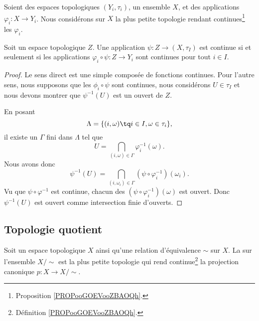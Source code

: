 \begin{proposition}
    Soient des espaces topologiques \( (Y_i,\tau_i)\), un ensemble \( X\), et des applications \( \varphi_i\colon X\to Y_i\). Nous considérons sur \( X\) la plus petite topologie rendant continues\footnote{Proposition \ref{PROPooGOEVooZBAOQh}.} les \( \varphi_i\).

    Soit un espace topologique \( Z\). Une application \( \psi\colon Z\to (X,\tau_I)\) est continue si et seulement si les applications \( \varphi_i\circ\psi\colon Z\to Y_i\) sont continues pour tout \( i\in I\).
\end{proposition}

\begin{proof}
    Le sens direct est une simple composée de fonctions continues. Pour l'autre sens, nous supposons que les \( \phi_i\circ\psi\) sont continues, nous considérons \( U\in \tau_I\) et nous devons montrer que \( \psi^{-1}(U)\) est un ouvert de \( Z\).

    En posant 
    \begin{equation}
        \Lambda=\{ (i,\omega)\tq i\in I,\omega\in \tau_i \},
    \end{equation}
    il existe un \( \Gamma\) fini dans \( \Lambda\) tel que
    \begin{equation}
        U=\bigcap_{(i,\omega)\in \Gamma}\varphi_i^{-1}(\omega).
    \end{equation}
    Nous avons donc
    \begin{equation}
        \psi^{-1}(U)=\bigcap_{(i,\omega_i)\in\Gamma}(\psi\circ\varphi_i^{-1})(\omega_i).
    \end{equation}
    Vu que \( \psi\circ\varphi^{-1}\) est continue, chacun des \( (\psi\circ\varphi_i^{-1})(\omega)\) est ouvert. Donc \( \psi^{-1}(U)\) est ouvert comme intersection finie d'ouverts.
\end{proof}


\subsection{Topologie quotient}

\begin{definition}        \label{DEFooHWSYooZZLXQU}
    Soit un espace topologique \( X\) ainsi qu'une relation d'équivalence \( \sim\) sur \( X\). La  sur l'ensemble \( X/\sim\) est la plus petite topologie qui rend continue\footnote{Définition \ref{PROPooGOEVooZBAOQh}.} la projection canonique \( p\colon X\to X/\sim\).
\end{definition}

